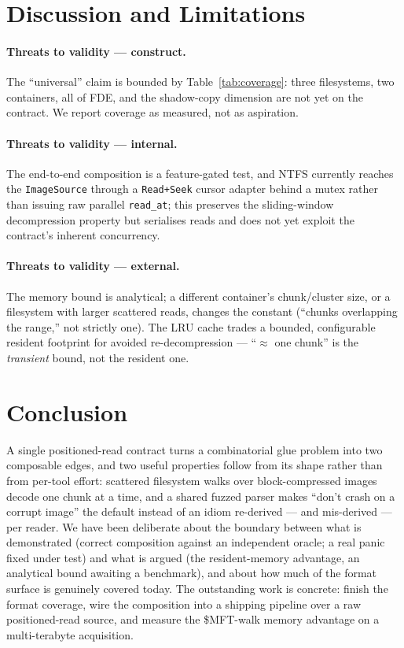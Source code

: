 \documentclass[10pt,twocolumn]{article}
\begin{document}
\section{Discussion and Limitations}\label{sec:disc}

\paragraph{Threats to validity --- construct.} The ``universal'' claim is bounded
by Table~\ref{tab:coverage}: three filesystems, two containers, all of FDE, and
the shadow-copy dimension are not yet on the contract. We report coverage as
measured, not as aspiration.

\paragraph{Threats to validity --- internal.} The end-to-end composition is a
feature-gated test, and NTFS currently reaches the \texttt{ImageSource} through a
\texttt{Read+Seek} cursor adapter behind a mutex rather than issuing raw parallel
\texttt{read\_at}; this preserves the sliding-window decompression property but
serialises reads and does not yet exploit the contract's inherent concurrency.

\paragraph{Threats to validity --- external.} The memory bound is analytical; a
different container's chunk/cluster size, or a filesystem with larger scattered
reads, changes the constant (``chunks overlapping the range,'' not strictly one).
The LRU cache trades a bounded, configurable resident footprint for avoided
re-decompression --- ``$\approx$ one chunk'' is the \emph{transient} bound, not the
resident one.

\section{Conclusion}\label{sec:concl}

A single positioned-read contract turns a combinatorial glue problem into two
composable edges, and two useful properties follow from its shape rather than from
per-tool effort: scattered filesystem walks over block-compressed images decode
one chunk at a time, and a shared fuzzed parser makes ``don't crash on a corrupt
image'' the default instead of an idiom re-derived --- and mis-derived --- per
reader. We have been deliberate about the boundary between what is demonstrated
(correct composition against an independent oracle; a real panic fixed under test)
and what is argued (the resident-memory advantage, an analytical bound awaiting a
benchmark), and about how much of the format surface is genuinely covered today.
The outstanding work is concrete: finish the format coverage, wire the
composition into a shipping pipeline over a raw positioned-read source, and
measure the \$MFT-walk memory advantage on a multi-terabyte acquisition.

{\small


}
\end{document}
